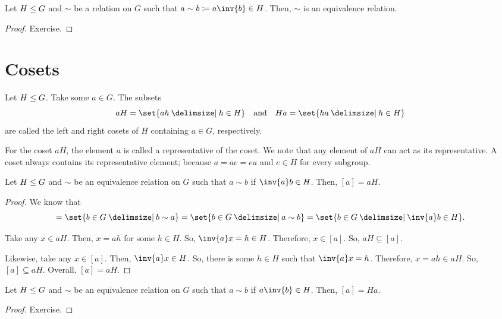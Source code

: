 \documentclass[11pt]{penrose}
\newcommand{\keyword}[1]{\textsf{#1}}
\begin{document}
\begin{nthm}
    Let $H \mathrel{\leq} G$ and $\sim$ be a relation on $G$ such that $a \sim b \coloneq a \inv{b} \in H$. Then, $\sim$ is an equivalence relation.
\end{nthm}
\begin{proof}
    Exercise.
\end{proof}

\section{Cosets}
\begin{ndfn}
    Let $H \mathrel{\leq} G$. Take some $a \in G$. The subsets
    \begin{equation*}
        aH = \set{ah \st h \in H}
        \quad\text{and}\quad
        Ha = \set{ha \st h \in H}
    \end{equation*}
    are called the left and right \keyword{cosets} of $H$ containing $a \in G$, respectively.
\end{ndfn}

For the coset $aH$, the element $a$ is called a \keyword{representative} of the coset. We note that any element of $aH$ can act as its representative. A coset always contains its representative element; because $a = a e = e a$ and $e \in H$ for every subgroup.

\begin{nthm}
    Let $H \mathrel{\leq} G$ and $\sim$ be an equivalence relation on $G$ such that $a \sim b$ if $\inv{a} b \in H$. Then, $[a] = aH$.
\end{nthm}
\begin{proof}
    We know that
    \begin{equation*}
        [a]
        = \set{b \in G \st b \sim a}
        = \set{b \in G \st a \sim b}
        = \set{b \in G \st \inv{a} b \in H}.
    \end{equation*}

    Take any $x \in aH$. Then, $x = ah$ for some $h \in H$. So, $\inv{a} x = h \in H$. Therefore, $x \in [a]$. So, $aH \subseteq [a]$.

    Likewise, take any $x \in [a]$. Then, $\inv{a} x \in H$. So, there is some $h \in H$ such that $\inv{a} x = h$. Therefore, $x = ah \in aH$. So, $[a] \subseteq aH$. Overall, $[a] = aH$.
\end{proof}

\begin{nthm}
    Let $H \mathrel{\leq} G$ and $\sim$ be an equivalence relation on $G$ such that $a \sim b$ if $a \inv{b} \in H$. Then, $[a] = Ha$.
\end{nthm}
\begin{proof}
    Exercise.
\end{proof}
\end{document}
